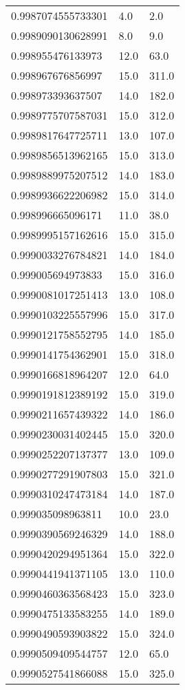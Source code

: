 \begin{center}
\begin{supertabular}[H]{p{0.30\textwidth}p{0.05\textwidth}p{0.05\textwidth}}
0.9987074555733301 & 4.0 & 2.0 \\ 
0.9989090130628991 & 8.0 & 9.0 \\ 
0.998955476133973 & 12.0 & 63.0 \\ 
0.998967676856997 & 15.0 & 311.0 \\ 
0.998973393637507 & 14.0 & 182.0 \\ 
0.9989775707587031 & 15.0 & 312.0 \\ 
0.9989817647725711 & 13.0 & 107.0 \\ 
0.9989856513962165 & 15.0 & 313.0 \\ 
0.9989889975207512 & 14.0 & 183.0 \\ 
0.9989936622206982 & 15.0 & 314.0 \\ 
0.998996665096171 & 11.0 & 38.0 \\ 
0.9989995157162616 & 15.0 & 315.0 \\ 
0.9990033276784821 & 14.0 & 184.0 \\ 
0.999005694973833 & 15.0 & 316.0 \\ 
0.9990081017251413 & 13.0 & 108.0 \\ 
0.9990103225557996 & 15.0 & 317.0 \\ 
0.9990121758552795 & 14.0 & 185.0 \\ 
0.9990141754362901 & 15.0 & 318.0 \\ 
0.9990166818964207 & 12.0 & 64.0 \\ 
0.9990191812389192 & 15.0 & 319.0 \\ 
0.9990211657439322 & 14.0 & 186.0 \\ 
0.9990230031402445 & 15.0 & 320.0 \\ 
0.9990252207137377 & 13.0 & 109.0 \\ 
0.9990277291907803 & 15.0 & 321.0 \\ 
0.9990310247473184 & 14.0 & 187.0 \\ 
0.999035098963811 & 10.0 & 23.0 \\ 
0.9990390569246329 & 14.0 & 188.0 \\ 
0.9990420294951364 & 15.0 & 322.0 \\ 
0.9990441941371105 & 13.0 & 110.0 \\ 
0.9990460363568423 & 15.0 & 323.0 \\ 
0.9990475133583255 & 14.0 & 189.0 \\ 
0.9990490593903822 & 15.0 & 324.0 \\ 
0.9990509409544757 & 12.0 & 65.0 \\ 
0.9990527541866088 & 15.0 & 325.0 \\ 

\end{supertabular}
\end{center}
